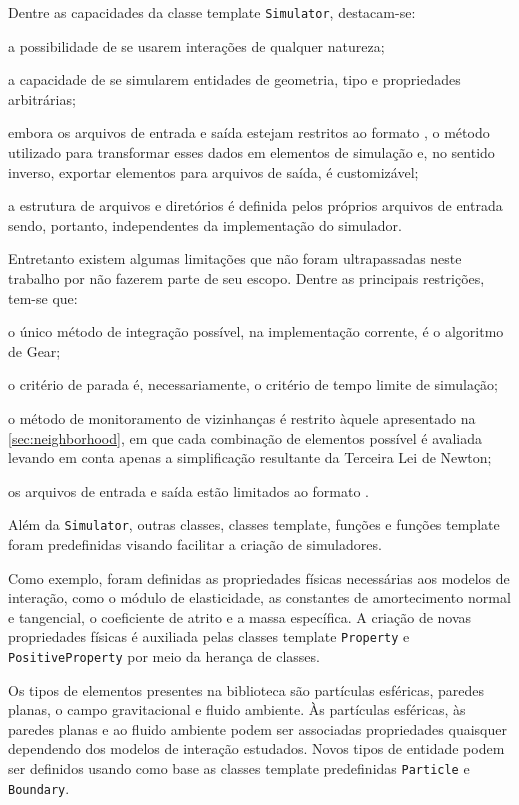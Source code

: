 Dentre as capacidades da classe template \lstinline[style=Inline C++]{Simulator}, destacam-se:
\begin{alineas}
\item a possibilidade de se usarem interações de qualquer natureza;
\item a capacidade de se simularem entidades de geometria, tipo e propriedades arbitrárias;
\item embora os arquivos de entrada e saída estejam restritos ao formato \JSON{}, o método utilizado para transformar esses dados em elementos de simulação e, no sentido inverso, exportar elementos para arquivos de saída, é customizável;
\item a estrutura de arquivos e diretórios é definida pelos próprios arquivos de entrada sendo, portanto, independentes da implementação do simulador.
\end{alineas}

Entretanto existem algumas limitações que não foram ultrapassadas neste trabalho por não fazerem parte de seu escopo. Dentre as principais restrições, tem-se que:
\begin{alineas}
\item o único método de integração possível, na implementação corrente, é o algoritmo de Gear;
\item o critério de parada é, necessariamente, o critério de tempo limite de simulação;
\item o método de monitoramento de vizinhanças é restrito àquele apresentado na \cref{sec:neighborhood}, em que cada combinação de elementos possível é avaliada levando em conta apenas a simplificação resultante da Terceira Lei de Newton;
\item os arquivos de entrada e saída estão limitados ao formato \JSON{}.
\end{alineas}

Além da \lstinline[style=Inline C++]{Simulator}, outras classes, classes template, funções e funções template foram predefinidas visando facilitar a criação de simuladores.

Como exemplo, foram definidas as propriedades físicas necessárias aos modelos de interação, como o módulo de elasticidade, as constantes de amortecimento normal e tangencial, o coeficiente de atrito e a massa específica. A criação de novas propriedades físicas é auxiliada pelas classes template \lstinline[style=Inline C++]{Property} e \lstinline[style=Inline C++]{PositiveProperty} por meio da herança de classes.

Os tipos de elementos presentes na biblioteca são partículas esféricas, paredes planas, o campo gravitacional e fluido ambiente. Às partículas esféricas, às paredes planas e ao fluido ambiente podem ser associadas propriedades quaisquer dependendo dos modelos de interação estudados. Novos tipos de entidade podem ser definidos usando como base as classes template predefinidas \lstinline[style=Inline C++]{Particle} e \lstinline[style=Inline C++]{Boundary}.


